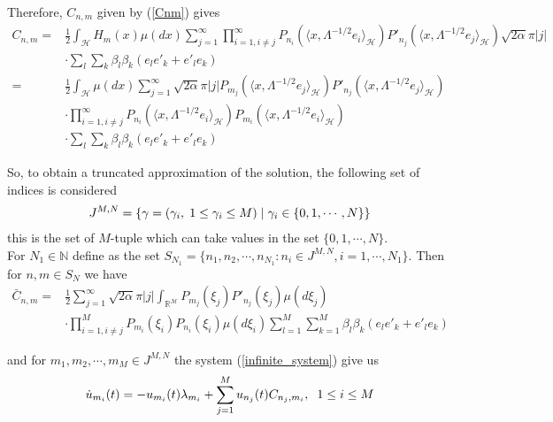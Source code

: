 	\noindent Therefore, $C_{n, m}$ given by (\ref{Cnm}) gives
	\begin{align*}
		C_{n, m} =& \displaystyle \frac{1}{2} \int_{\mathcal{H}} H_m (x) \mu (dx) \sum_{j = 1}^{\infty} \prod_{i = 1, i \neq j}^{\infty} P_{n_i} (\langle x, \Lambda^{-1 / 2} e_i \rangle_{\mathcal{H}}) P'_{n_j} (\langle x, \Lambda^{-1 / 2} e_j \rangle_{\mathcal{H}})  \sqrt{2 \alpha} \pi |j| \\
		&\cdot \sum_l
		\sum_k \beta_l \beta_k (e_l e'_k + e'_l e_k) \\
		=& \displaystyle \frac{1}{2} \int_{\mathcal{H}} \mu (dx) \sum_{j = 1}^{\infty} \sqrt{2 \alpha} \pi |j| P_{m_j} (\langle x, \Lambda^{-1 / 2} e_j \rangle_{\mathcal{H}}) P'_{n_j} (\langle x, \Lambda^{-1 / 2} e_j \rangle_{\mathcal{H}}) \\  &\cdot \prod_{i = 1, i \neq j}^{\infty} P_{n_i} (\langle x, \Lambda^{-1 / 2} e_i \rangle_{\mathcal{H}}) P_{m_i} (\langle x, \Lambda^{-1 / 2} e_i \rangle_{\mathcal{H}}) \\
		&\cdot \sum_l
		\sum_k \beta_l \beta_k (e_l e'_k + e'_l e_k) 
	\end{align*}

	So, to obtain a truncated approximation of the solution, the following set of indices is considered
	\begin{align}
		J^{M, N} = \{\gamma = (\gamma_i, \hspace{1mm} 1 \leq \gamma_i \leq M  ) \hspace{1mm} | \hspace{1mm} \gamma_i \in \{0, 1, \cdots, N \} \}
	\end{align}
	this is the set of $M$-tuple which can take values in the set $\{0, 1, \cdots, N \}$. \\
	
	For $N_1 \in \mathbb{N}$ define as the set $S_{N_1} = \{n_1 , n_2 , \cdots , n_{N_1} : n_i \in J^{M,N} , i = 1, \cdots , N_1 \}$. Then for $n, m \in S_{N}$ we have 
	\begin{align*}
		\bar{C}_{n, m} =& \displaystyle \frac{1}{2} \sum_{j = 1}^{\infty} \sqrt{2 \alpha} \pi |j| \int_{\mathcal{\mathbb{R}^M}} P_{m_j} (\xi_j) P'_{n_j} (\xi_j) \mu (d \xi_j) \\  
		&\cdot \prod_{i = 1, i \neq j}^{M} P_{m_i} (\xi_i) P_{n_i} (\xi_i) \mu (d \xi_i) \sum_{l=1}^{M} \sum_{k=1}^{M} \beta_l \beta_k (e_l e'_k + e'_l e_k)
	\end{align*}

	and for $m_1, m_2, \cdots, m_M \in J^{M, N}$ the system (\ref{infinite_system}) give us
	\begin{align}
		\label{finite_system}
		\dot{u}_{m_i} (t) = -u_{m_i} (t) \lambda_{m_i} + \displaystyle \sum_{j=1}^{M} u_{n_j} (t) C_{n_j, m_i} , \hspace{2mm} 1 \leq i \leq M	
	\end{align}
	
